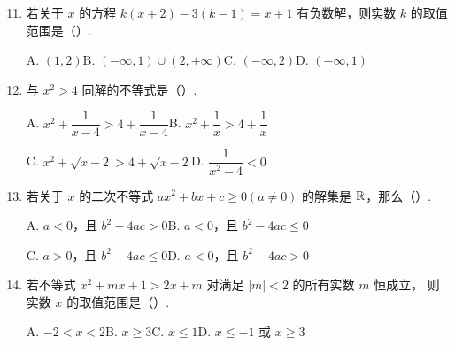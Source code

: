 \documentclass[a4paper,11pt]{article}
\begin{document}
\begin{enumerate}
\setcounter{enumi}{10}

\item 若关于 $x$ 的方程 $k(x+2)-3(k-1)=x+1$ 有负数解，则实数 $k$ 的取值范围是\mbox{（\quad）}.

\keepwithprev
A. $(1,2)$\qquad B. $(-\infty,1)\cup(2,+\infty)$\qquad C. $(-\infty,2)$\qquad D. $(-\infty,1)$


\item 与 $x^2>4$ 同解的不等式是\mbox{（\quad）}.

\keepwithprev
A. $x^2+\dfrac{1}{x-4}>4+\dfrac{1}{x-4}$\qquad B. $x^2+\dfrac1x>4+\dfrac1x$

C. $x^2+\sqrt{x-2}>4+\sqrt{x-2}$\qquad D. $\dfrac{1}{x^2-4}<0$

\ifanswer
\solbegin
{}
\solend

\fi

\item 若关于 $x$ 的二次不等式 $ax^2+bx+c\geqslant0(a\neq0)$ 的解集是 $\mathbb{R}$，那么\mbox{（\quad）}.

\keepwithprev
A. $a<0$，且 $b^2-4ac>0$\qquad B. $a<0$，且 $b^2-4ac\leqslant0$

C. $a>0$，且 $b^2-4ac\leqslant0$\qquad D. $a<0$，且 $b^2-4ac>0$


\item 若不等式 $x^2+mx+1>2x+m$ 对满足 $|m|<2$ 的所有实数 $m$ 恒成立，
则实数 $x$ 的取值范围是\mbox{（\quad）}.

\keepwithprev
A. $-2<x<2$\qquad B. $x\geqslant3$\qquad C. $x\leqslant1$\qquad D. $x\leqslant-1$ 或 $x\geqslant3$


\end{enumerate}
\end{document}
